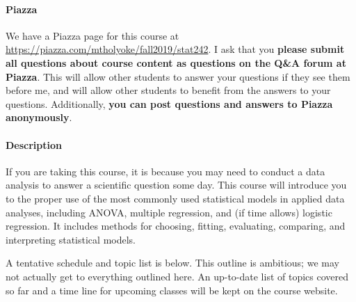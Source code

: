 \documentclass[11pt]{article}
\begin{document}
	\paragraph{Piazza}
	
	We have a Piazza page for this course at \url{https://piazza.com/mtholyoke/fall2019/stat242}.  I ask that you \textbf{please submit all questions about course content as questions on the Q{\&}A forum at Piazza}.  This will allow other students to answer your questions if they see them before me, and will allow other students to benefit from the answers to your questions.  Additionally, \textbf{you can post questions and answers to Piazza anonymously}.
	
	\paragraph{Description}
	
	If you are taking this course, it is because you may need to conduct a data analysis to answer a scientific question some day.
	This course will introduce you to the proper use of the most commonly used statistical models in applied data analyses, including ANOVA, multiple regression, and (if time allows) logistic regression.
	It includes methods for choosing, fitting, evaluating, comparing, and interpreting statistical models.
	
	A tentative schedule and topic list is below.  This outline is ambitious; we may not actually get to everything outlined here.  An up-to-date list of topics covered so far and a time line for upcoming classes will be kept on the course website.
	
\end{document}
